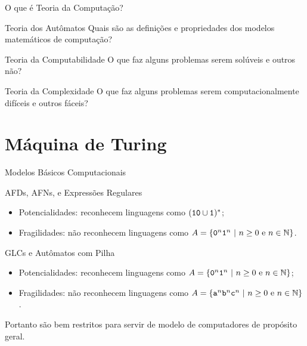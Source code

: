 \documentclass[xcolor=dvipsnames,table]{beamer}
\begin{document}
	\begin{frame}{O que é Teoria da Computação?}
		\begin{block}{Teoria dos Autômatos}
			Quais são as definições e propriedades dos modelos matemáticos de computação?
		\end{block} \pause
		\begin{block}{Teoria da Computabilidade}
			O que faz alguns problemas serem solúveis e outros não?		
		\end{block} \pause
		\begin{block}{Teoria da Complexidade}
			O que faz alguns problemas serem computacionalmente difíceis e outros fáceis?
		\end{block}
	\end{frame}
	
	\section{Máquina de Turing}
	\begin{frame}{Modelos Básicos Computacionais}
		\begin{block}{AFDs, AFNs, e Expressões Regulares}
			\begin{itemize}
				\item Potencialidades: reconhecem linguagens como $({\tt 10} \cup {\tt 1})^*$;
				\item Fragilidades: não reconhecem linguagens como $A = \{ {\tt 0}^n {\tt 1}^n \mbox{ | } n \geq 0 \mbox{ e } n \in \mathbb{N} \}$.
			\end{itemize}
		\end{block} \pause
		\begin{block}{GLCs e Autômatos com Pilha}
			\begin{itemize}
				\item Potencialidades: reconhecem linguagens como $A = \{ {\tt 0}^n {\tt 1}^n \mbox{ | } n \geq 0 \mbox{ e } n \in \mathbb{N} \}$;
				\item Fragilidades: não reconhecem linguagens como $A = \{ {\tt a}^n {\tt b}^n {\tt c}^n\mbox{ | } n \geq 0 \mbox{ e } n \in \mathbb{N} \}$.
			\end{itemize}
		\end{block} \pause
		\begin{alertblock}{}
			Portanto são bem restritos para servir de modelo de computadores de propósito geral.
		\end{alertblock}
	\end{frame}
	
\end{document}
